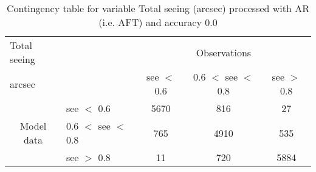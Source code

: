 \begin{table}[]
\begin{center}
\begin{tabular}{llccc}
\hline
{Total seeing}                                       &                                                    & \multicolumn{3}{c}{Observations}                 \\
{arcsec}                                       &                             & see $<$ 0.6   & 0.6 $<$ see $<$ 0.8 & see $>$ 0.8 \\
\hline
\multicolumn{1}{c}{\multirow{3}{*}{Model data}}  & see $<$ 0.6             & 5670                & 816                       & 27              \\
                                                 & 0.6  $<$ see $<$ 0.8 & 765                & 4910                       & 535              \\
                                                 & see $>$ 0.8             & 11                & 720                       & 5884              \\
\hline
\end{tabular}
\end{center}
\caption{Contingency table for variable Total seeing (arcsec) processed with AR (i.e. AFT) and accuracy 0.0}
\label{tab:contingencyseeAFT}
\end{table}
